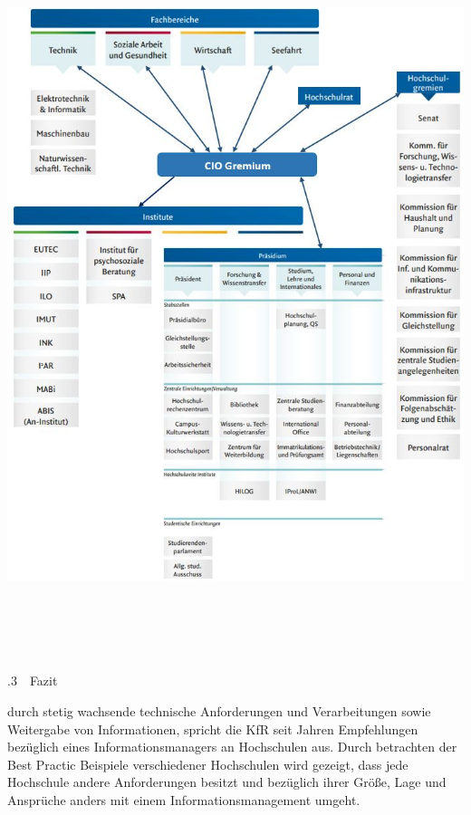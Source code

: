 \documentclass{article}
\begin{document}
\begin{center}
\includegraphics[width=16.768cm,height=21.108cm]{INMGruppe6TeilCIO-img/INMGruppe6TeilCIO-img004.jpg}
\end{center}
.3\ \ Fazit

durch stetig wachsende technische Anforderungen und Verarbeitungen sowie Weitergabe von Informationen, spricht die KfR
seit Jahren Empfehlungen bezüglich eines Informationsmanagers an Hochschulen aus. Durch betrachten der Best Practic
Beispiele verschiedener Hochschulen wird gezeigt, dass jede Hochschule andere Anforderungen besitzt und bezüglich ihrer
Größe, Lage und Ansprüche anders mit einem Informationsmanagement umgeht. 
\end{document}
